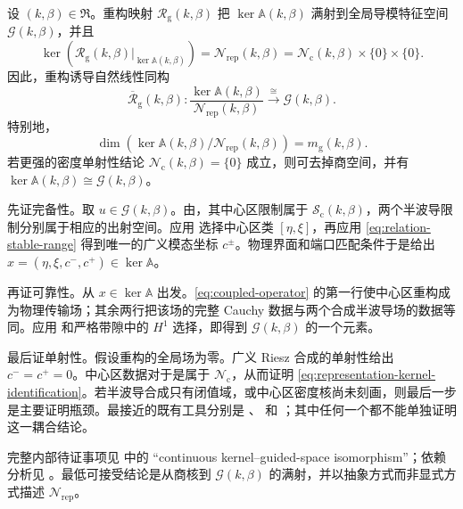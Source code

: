 \begin{theorem}
\label{thm:main-kernel-equivalence}
设 $(k,\beta)\in\mathfrak R$。重构映射 $\mathcal R_{\mathrm g}(k,\beta)$ 把 $\ker\mathbb A(k,\beta)$ 满射到全局导模特征空间 $\mathcal G(k,\beta)$，并且
\begin{equation}
  \ker\!\left(
  \mathcal R_{\mathrm g}(k,\beta)|_{\ker\mathbb A(k,\beta)}
  \right)
  =\mathcal N_{\mathrm{rep}}(k,\beta)
  =\mathcal N_{\mathrm c}(k,\beta)\times\{0\}\times\{0\}.
  \label{eq:representation-kernel-identification}
\end{equation}
因此，重构诱导自然线性同构
\begin{equation}
  \overline{\mathcal R}_{\mathrm g}(k,\beta):
  \frac{\ker\mathbb A(k,\beta)}{\mathcal N_{\mathrm{rep}}(k,\beta)}
  \xrightarrow{\ \cong\ }\mathcal G(k,\beta).
  \label{eq:main-quotient-isomorphism}
\end{equation}
特别地，
\begin{equation}
  \dim\!\left(
  \ker\mathbb A(k,\beta)/\mathcal N_{\mathrm{rep}}(k,\beta)
  \right)=m_{\mathrm g}(k,\beta).
  \label{eq:multiplicity-preservation}
\end{equation}
若更强的密度单射性结论 $\mathcal N_{\mathrm c}(k,\beta)=\{0\}$ 成立，则可去掉商空间，并有 $\ker\mathbb A(k,\beta)\cong\mathcal G(k,\beta)$。
\end{theorem}
\begin{proofroadmap}
先证完备性。取 $u\in\mathcal G(k,\beta)$。由，其中心区限制属于 $\mathcal S_{\mathrm c}(k,\beta)$，两个半波导限制分别属于相应的出射空间。应用 选择中心区类 $[\eta,\xi]$，再应用 \eqref{eq:relation-stable-range} 得到唯一的广义模态坐标 $c^\pm$。物理界面和端口匹配条件于是给出 $x=(\eta,\xi,c^-,c^+)\in\ker\mathbb A$。

再证可靠性。从 $x\in\ker\mathbb A$ 出发。\eqref{eq:coupled-operator} 的第一行使中心区重构成为物理传输场；其余两行把该场的完整 Cauchy 数据与两个合成半波导场的数据等同。应用 和严格带隙中的 $H^1$ 选择，即得到 $\mathcal G(k,\beta)$ 的一个元素。

最后证单射性。假设重构的全局场为零。广义 Riesz 合成的单射性给出 $c^-=c^+=0$。中心区数据对于是属于 $\mathcal N_{\mathrm c}$，从而证明 \eqref{eq:representation-kernel-identification}。若半波导合成只有闭值域，或中心区密度核尚未刻画，则最后一步是主要证明瓶颈。最接近的既有工具分别是 \cite[Theorem~4.5]{Fliss2013}、\cite[Theorem~4 and Appendix~A]{BarnettGreengard2010} 和 \cite[Theorem~2.2]{HohageSoussi2013}；其中任何一个都不能单独证明这一耦合结论。

完整内部待证事项见  中的 ``continuous kernel--guided-space isomorphism''；依赖分析见 。最低可接受结论是从商核到 $\mathcal G(k,\beta)$ 的满射，并以抽象方式而非显式方式描述 $\mathcal N_{\mathrm{rep}}$。
\end{proofroadmap}
